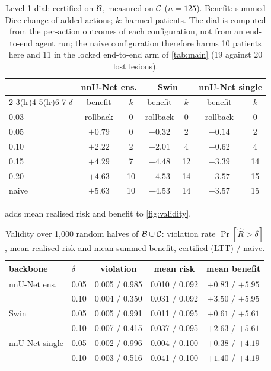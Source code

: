 \begin{table}[h]
\centering
\caption{Level-1 dial: certified on $\mathcal{B}$, measured on $\mathcal{C}$ ($n=125$). Benefit: summed Dice change of added actions; $k$: harmed patients. The dial is computed from the per-action outcomes of each configuration, not from an end-to-end agent run; the naive configuration therefore harms 10 patients here and 11 in the locked end-to-end arm of \cref{tab:main} (19 against 20 lost lesions).}
\label{tab:supp_dial}
\footnotesize
\setlength{\tabcolsep}{3.5pt}
\begin{tabular}{@{}lcccccc@{}}
\toprule
& \multicolumn{2}{c}{nnU-Net ens.} & \multicolumn{2}{c}{Swin} & \multicolumn{2}{c}{nnU-Net single} \\
\cmidrule(lr){2-3}\cmidrule(lr){4-5}\cmidrule(lr){6-7}
$\delta$ & benefit & $k$ & benefit & $k$ & benefit & $k$ \\
\midrule
0.03 & rollback & 0 & rollback & 0 & rollback & 0 \\
0.05 & $+0.79$ & 0 & $+0.32$ & 2 & $+0.14$ & 2 \\
0.10 & $+2.22$ & 2 & $+2.01$ & 4 & $+0.62$ & 4 \\
0.15 & $+4.29$ & 7 & $+4.48$ & 12 & $+3.39$ & 14 \\
0.20 & $+4.63$ & 10 & $+4.53$ & 14 & $+3.57$ & 15 \\
naive & $+5.63$ & 10 & $+4.53$ & 14 & $+3.57$ & 15 \\
\bottomrule
\end{tabular}
\end{table}

  adds mean realised risk and benefit to \cref{fig:validity}.

\begin{table}[h]
\centering
\caption{Validity over 1,000 random halves of $\mathcal{B}\cup\mathcal{C}$: violation rate $\Pr[\hat R>\delta]$, mean realised risk and mean summed benefit, certified (LTT) / naive.}
\label{tab:supp_validity}
\footnotesize
\setlength{\tabcolsep}{3pt}
\begin{tabular}{@{}llccc@{}}
\toprule
backbone & $\delta$ & violation & mean risk & mean benefit \\
\midrule
nnU-Net ens. & 0.05 & 0.005 / 0.985 & 0.010 / 0.092 & $+0.83$ / $+5.95$ \\
 & 0.10 & 0.004 / 0.350 & 0.031 / 0.092 & $+3.50$ / $+5.95$ \\
Swin & 0.05 & 0.005 / 0.991 & 0.011 / 0.095 & $+0.61$ / $+5.61$ \\
 & 0.10 & 0.007 / 0.415 & 0.037 / 0.095 & $+2.63$ / $+5.61$ \\
nnU-Net single & 0.05 & 0.002 / 0.996 & 0.004 / 0.100 & $+0.38$ / $+4.19$ \\
 & 0.10 & 0.003 / 0.516 & 0.041 / 0.100 & $+1.40$ / $+4.19$ \\
\bottomrule
\end{tabular}
\end{table}

